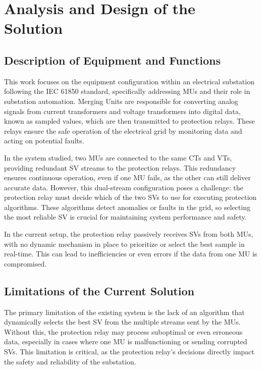 \chapter{Analysis and Design of the Solution} %

\section{Description of Equipment and Functions}

This work focuses on the equipment configuration within an electrical substation following the IEC 61850 standard, specifically addressing MUs and their role in substation automation. Merging Units are responsible for converting analog signals from current transformers and voltage transformers into digital data, known as sampled values, which are then transmitted to protection relays. These relays ensure the safe operation of the electrical grid by monitoring data and acting on potential faults.

In the system studied, two MUs are connected to the same CTs and VTs, providing redundant SV streams to the protection relays. This redundancy ensures continuous operation, even if one MU fails, as the other can still deliver accurate data. However, this dual-stream configuration poses a challenge: the protection relay must decide which of the two SVs to use for executing protection algorithms. These algorithms detect anomalies or faults in the grid, so selecting the most reliable SV is crucial for maintaining system performance and safety.

In the current setup, the protection relay passively receives SVs from both MUs, with no dynamic mechanism in place to prioritize or select the best sample in real-time. This can lead to inefficiencies or even errors if the data from one MU is compromised.

\section{Limitations of the Current Solution}

The primary limitation of the existing system is the lack of an algorithm that dynamically selects the best SV from the multiple streams sent by the MUs. Without this, the protection relay may process suboptimal or even erroneous data, especially in cases where one MU is malfunctioning or sending corrupted SVs. This limitation is critical, as the protection relay’s decisions directly impact the safety and reliability of the substation.

